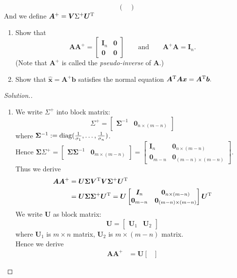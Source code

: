 \begin{enumerate}
\[\begin{pmatrix}
\end{pmatrix}
\]
And we define $\bm A^+=\bm V\Sigma^+\bm U^{\mathrm T}$
\begin{enumerate}
\item
Show that
\[
\bm A\bm A^+=\begin{bmatrix}
\bm I_n&\bm0\\\bm0&\bm0
\end{bmatrix}\qquad\text{and}\qquad
\bm A^+\bm A=\bm I_n.
\]
(Note that $\bm A^+$ is called the \emph{pseudo-inverse} of $\bm A$.)
\item
Show that $\hat{\bm x}=\bm A^+\bm b$ satisfies the normal equation $\bm A^{\mathrm T}\bm A\bm x=\bm A^{\mathrm T}\bm b.$
\end{enumerate}
\begin{proof}[Solution.]
\begin{enumerate}
\item
We write $\Sigma^+$ into block matrix:
\[
\Sigma^+=\begin{bmatrix}
\bm\Sigma^{-1}&\bm0_{n\times(m-n)}
\end{bmatrix}
\]
where $\bm\Sigma^{-1}:=\operatorname{diag}(\frac{1}{\sigma_1},\dots,\frac{1}{\sigma_n})$.\\
Hence $\bm\Sigma\Sigma^+=\begin{bmatrix}
\bm\Sigma\bm\Sigma^{-1}&\bm0_{m\times(m-n)}\end{bmatrix}=
\begin{bmatrix}
\bm I_{n}&\bm0_{n\times(m-n)}\\\bm0_{m-n}&\bm0_{(m-n)\times(m-n)}
\end{bmatrix}
.$\\
Thus we derive
\begin{align*}
\bm A\bm A^+&=\bm U\bm\Sigma\bm V^{\mathrm T}\bm V\bm\Sigma^+\bm U^{\mathrm T}\\
&=\bm U\bm\Sigma\bm\Sigma^+\bm U^{\mathrm T}=
\bm U\begin{bmatrix}
\bm I_{n}&\bm0_{n\times(m-n)}\\\bm0_{m-n}&\bm0_{(m-n)\times(m-n)}
\end{bmatrix}\bm U^{\mathrm T}
\end{align*}
We write $\bm U$ as block matrix:
\[
\bm U=\begin{bmatrix}
\bm U_1&\bm U_2
\end{bmatrix}
\]
where $\bm U_1$ is $m\times n$ matrix, $\bm U_2$ is $m\times (m-n)$ matrix.\\
Hence we derive
\[
\begin{aligned}
\bm A\bm A^+&=\bm U\begin{bmatrix}

\end{bmatrix}
\end{aligned}\]
\end{enumerate}
\end{proof}
\end{enumerate}
